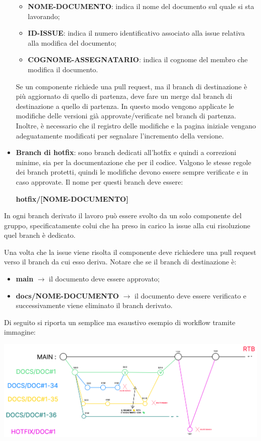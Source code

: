 \begin{itemize}
            \begin{itemize}
                  \item \textbf{NOME-DOCUMENTO}: indica il nome del documento sul quale si sta lavorando;
                  \item \textbf{ID-ISSUE}: indica il numero identificativo associato alla issue relativa alla modifica del documento;
                  \item \textbf{COGNOME-ASSEGNATARIO}: indica il cognome del membro che modifica il documento.
            \end{itemize}
            Se un componente richiede una pull request, ma il branch di destinazione è più aggiornato di quello di partenza,
            deve fare un merge dal branch di destinazione a quello di partenza. In questo modo vengono applicate le modifiche delle versioni 
            già approvate/verificate nel branch di partenza. Inoltre, è necessario che il registro delle modifiche e la pagina iniziale
            vengano adeguatamente modificati per segnalare l'incremento della versione.
      \item \textbf{Branch di hotfix}: sono branch dedicati all'hotfix e quindi a correzioni minime, sia per la documentazione che per il codice. Valgono le stesse regole dei
            branch protetti, quindi le modifiche devono essere sempre verificate e in caso approvate.
            Il nome per questi branch deve essere:
            \begin{center}
                  \textbf{hotfix/[NOME-DOCUMENTO]}
            \end{center}
\end{itemize}

In ogni branch derivato il lavoro può essere svolto da un solo componente del
gruppo, specificatamente colui che ha preso in carico la issue alla cui
risoluzione quel branch è dedicato.

Una volta che la issue viene risolta il componente deve richiedere una pull
request verso il branch da cui esso deriva. Notare che se il branch
di destinazione è:
\begin{itemize}
      \item \textbf{main} $\rightarrow$ il documento deve essere approvato;
      \item \textbf{docs/NOME-DOCUMENTO} $\rightarrow$ il documento deve essere verificato e successivamente viene eliminato il branch derivato.
\end{itemize}

Di seguito si riporta un semplice ma esaustivo esempio di workflow tramite
immagine:
\begin{center}
      \includegraphics[scale = 0.33]{template/images/workflow.png}
\end{center}

